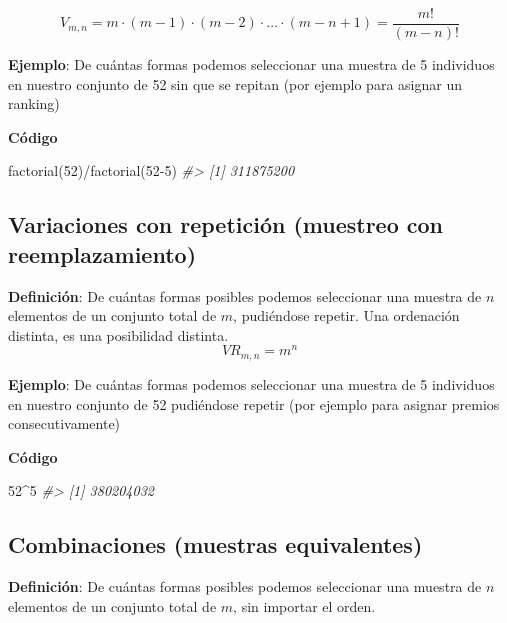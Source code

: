 \documentclass[
]{book}
\newenvironment{Shaded}{\begin{snugshade}}{\end{snugshade}}
\newcommand{\CommentTok}[1]{\textcolor[rgb]{0.56,0.35,0.01}{\textit{#1}}}
\newcommand{\DecValTok}[1]{\textcolor[rgb]{0.00,0.00,0.81}{#1}}
\newcommand{\FunctionTok}[1]{\textcolor[rgb]{0.00,0.00,0.00}{#1}}
\newcommand{\NormalTok}[1]{#1}
\newcommand{\SpecialCharTok}[1]{\textcolor[rgb]{0.00,0.00,0.00}{#1}}
\begin{document}
\[V_{m,n} = m\cdot(m-1)\cdot(m-2)\cdot\ldots\cdot (m-n+1) = \frac{m!}{(m-n)!}\]

\textbf{Ejemplo}: De cuántas formas podemos seleccionar una muestra
de 5 individuos en nuestro conjunto de 52 sin que se repitan (por
ejemplo para asignar un ranking)

\textbf{Código}

\begin{Shaded}
\begin{Highlighting}[]
\FunctionTok{factorial}\NormalTok{(}\DecValTok{52}\NormalTok{)}\SpecialCharTok{/}\FunctionTok{factorial}\NormalTok{(}\DecValTok{52{-}5}\NormalTok{)}
\CommentTok{\#\textgreater{} [1] 311875200}
\end{Highlighting}
\end{Shaded}

\hypertarget{variaciones-con-repeticiuxf3n-muestreo-con-reemplazamiento}{%
\subsection{Variaciones con repetición (muestreo con reemplazamiento)}\label{variaciones-con-repeticiuxf3n-muestreo-con-reemplazamiento}}

\textbf{Definición}: De cuántas formas posibles podemos seleccionar
una muestra de \(n\) elementos de un conjunto total de \(m\), pudiéndose
repetir. Una ordenación distinta, es una posibilidad distinta.
\[\mathit{VR}_{m,n} = m^n\]

\textbf{Ejemplo}: De cuántas formas podemos seleccionar una muestra
de 5 individuos en nuestro conjunto de 52 pudiéndose repetir (por
ejemplo para asignar premios consecutivamente)

\textbf{Código}

\begin{Shaded}
\begin{Highlighting}[]
\DecValTok{52}\SpecialCharTok{\^{}}\DecValTok{5}
\CommentTok{\#\textgreater{} [1] 380204032}
\end{Highlighting}
\end{Shaded}

\hypertarget{combinaciones-muestras-equivalentes}{%
\subsection{Combinaciones (muestras equivalentes)}\label{combinaciones-muestras-equivalentes}}

\textbf{Definición}: De cuántas formas posibles podemos seleccionar
una muestra de \(n\) elementos de un conjunto total de \(m\), sin importar
el orden.
\end{document}
